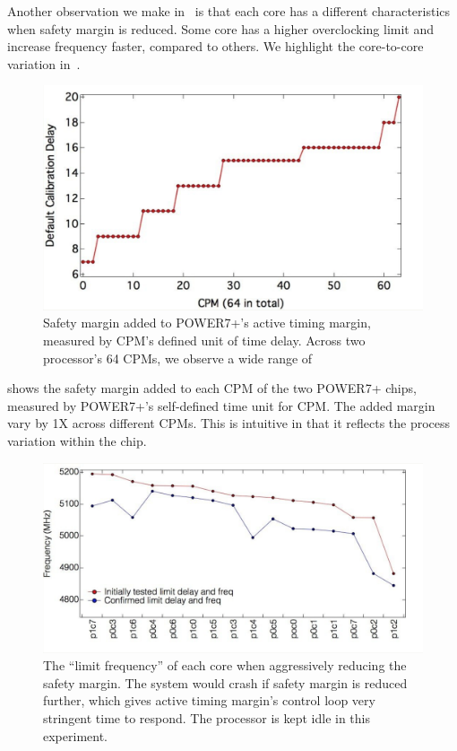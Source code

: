Another observation we make in~ is that each core has a different characteristics when safety margin is reduced. Some core has a higher overclocking limit and increase frequency faster, compared to others. We highlight the core-to-core variation in~.

\begin{figure}[t]
  \centering
  \includegraphics[trim=0 0 0 0, clip, width=0.6\columnwidth]{graphs/cpm-delay-variation.png}
  \caption{Safety margin added to POWER7+'s active timing margin, measured by CPM's defined unit of time delay. Across two processor's 64 CPMs, we observe a wide range of }
  \label{fig:cpm-delay-variation}
\end{figure}

 shows the safety margin added to each CPM of the two POWER7+ chips, measured by POWER7+'s self-defined time unit for CPM. The added margin vary by 1X across different CPMs. This is intuitive in that it reflects the process variation within the chip. 

\begin{figure}[t]
  \centering
  \includegraphics[trim=0 0 0 0, clip, width=0.8\columnwidth]{graphs/cpm-limit-freq.png}
  \caption{The ``limit frequency'' of each core when aggressively reducing the safety margin. The system would crash if safety margin is reduced further, which gives active timing margin's control loop very stringent time to respond. The processor is kept idle in this experiment.}
  \label{fig:cpm-limit-freq}
\end{figure}

